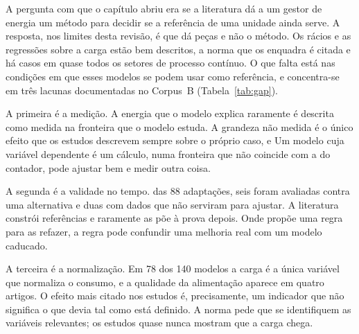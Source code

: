 A pergunta com que o capítulo abriu era se a literatura dá a um gestor de
energia um método para decidir se a referência de uma unidade ainda serve.
A resposta, nos limites desta revisão, é que dá peças e não o método. Os
rácios e as regressões sobre a carga estão bem descritos, a norma que os
enquadra é citada e há casos em quase todos os setores de processo contínuo.
 O que falta está nas condições em que
esses modelos se podem usar como referência, e concentra-se em três lacunas
documentadas no Corpus~B (Tabela~\ref{tab:gap}).

A primeira é a medição. A energia que o modelo explica raramente é descrita
como medida na fronteira que o modelo estuda.  A grandeza não medida é o
único efeito que os estudos descrevem sempre sobre o próprio caso, e  Um modelo cuja
variável dependente é um cálculo, numa fronteira que não coincide com a do
contador, pode ajustar bem e medir outra coisa.

A segunda é a validade no tempo.  das 88 adaptações, seis foram avaliadas contra uma alternativa e
duas com dados que não serviram para ajustar. A literatura constrói
referências e raramente as põe à prova depois. Onde propõe uma regra para as
refazer, a regra pode confundir uma melhoria real com um modelo caducado.

A terceira é a normalização. Em 78 dos 140 modelos a carga é a única
variável que normaliza o consumo, e a qualidade da alimentação aparece em
quatro artigos.  O efeito mais citado
nos estudos é, precisamente, um indicador que não significa o que devia tal
como está definido. A norma pede
que se identifiquem as variáveis relevantes; os estudos quase nunca mostram
que a carga chega.

